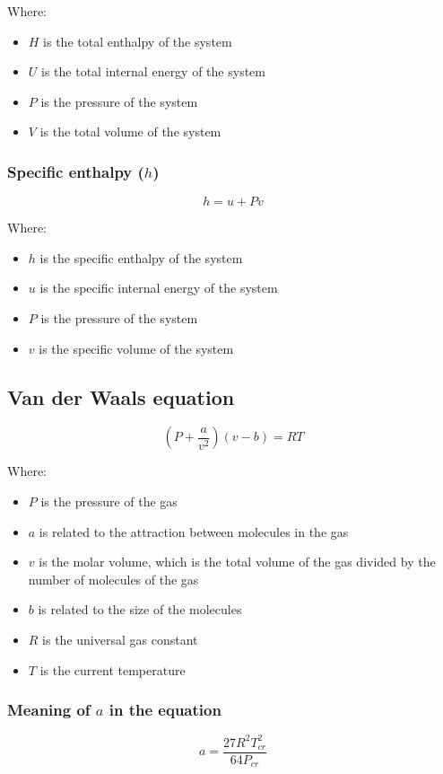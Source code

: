 \documentclass[11pt]{article}
\begin{document}
Where:
\begin{itemize}
\item \(H\) is the total enthalpy of the system
\item \(U\) is the total internal energy of the system
\item \(P\) is the pressure of the system
\item \(V\) is the total volume of the system
\end{itemize}

\subsubsection{Specific enthalpy (\(h\))}
\label{sec:org6c604b7}
\[h = u + Pv\]

Where:
\begin{itemize}
\item \(h\) is the specific enthalpy of the system
\item \(u\) is the specific internal energy of the system
\item \(P\) is the pressure of the system
\item \(v\) is the specific volume of the system
\end{itemize}

\newpage

\subsection{Van der Waals equation}
\label{sec:org81575e3}
\[\left(P + \frac{a}{v^2} \right) \left(v - b \right) = RT\]

Where:
\begin{itemize}
\item \(P\) is the pressure of the gas
\item \(a\) is related to the attraction between molecules in the gas
\item \(v\) is the molar volume, which is the total volume of the gas divided by the number of molecules of the gas
\item \(b\) is related to the size of the molecules
\item \(R\) is the universal gas constant
\item \(T\) is the current temperature
\end{itemize}

\subsubsection{Meaning of \(a\) in the equation}
\label{sec:org4784410}
\[a = \frac{27 R^2 T_{cr}^2}{64 P_{cr}}\]
\end{document}

